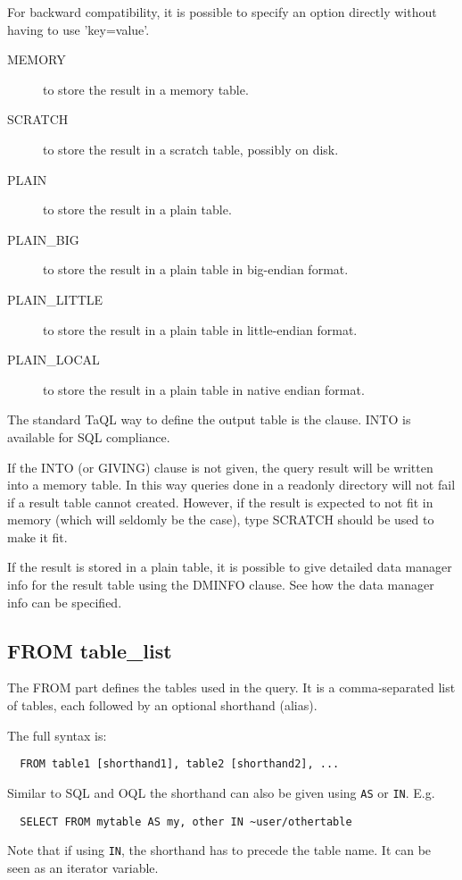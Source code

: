 For backward compatibility, it is possible
to specify an option directly without having to use 'key=value'. 
\begin{description}
  \item[MEMORY ]to store the result in a memory table.
  \item[SCRATCH ]to store the result in a scratch table, possibly on disk.
  \item[PLAIN ]to store the result in a plain table.
  \item[PLAIN\_BIG ]to store the result in a plain table in big-endian format.
  \item[PLAIN\_LITTLE ]to store the result in a plain table in little-endian format.
  \item[PLAIN\_LOCAL ]to store the result in a plain table in native
    endian format.
\end{description}
The standard TaQL way to define the output table is the
 clause. INTO is available
for SQL compliance.

If the INTO (or GIVING) clause is not given, the query result will be
written into a memory table. In this way queries done in a readonly
directory will not fail if a result table cannot created.
However, if the result is expected to not fit in memory (which
will seldomly be the case), type SCRATCH should be used to make it
fit.

If the result is stored in a plain table, it is possible to give
detailed data manager info for the result table using the DMINFO clause.
See  
how the data manager info can be specified.


\subsection{\label{TAQL:TABLE_LIST}FROM table\_list}
The FROM part defines the tables used in the query.
It is a comma-separated list of tables, each followed by an optional
shorthand (alias).

The full  syntax is:
\begin{verbatim}
  FROM table1 [shorthand1], table2 [shorthand2], ...
\end{verbatim}
Similar to SQL and OQL the shorthand can also be given using
\texttt{AS} or \texttt{IN}. E.g.
\begin{verbatim}
  SELECT FROM mytable AS my, other IN ~user/othertable
\end{verbatim}
Note that if using \texttt{IN}, the shorthand has to precede
the table name. It can be seen as an iterator variable.

